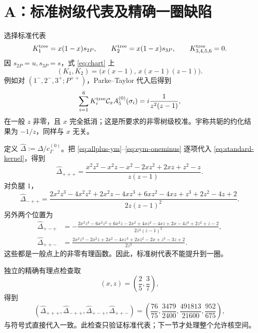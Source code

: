 \documentclass[11pt,a4paper,UTF8]{ctexart}
\newcommand{\cC}{\mathcal C}
\begin{document}
\section{A：标准树级代表及精确一圈缺陷}

选择标准代表
\begin{equation}
K^{\rm tree}_{1}=x(1-x)s_{2P},\qquad
K^{\rm tree}_{2}=x(1-x)s_{3P},\qquad
K^{\rm tree}_{3,4,5,6}=0.
\label{eq:standard-kernel}
\end{equation}
因 $s_{2P}=u,s_{3P}=s$，式 \eqref{eq:chart} 上
\begin{equation}
(K_1,K_2)=\bigl(x(x-1),\,x(x-1)(z-1)\bigr).
\end{equation}
例如对 $(1^-,2^-,3^+;P^{++})$，Parke--Taylor 代入后得到
\begin{equation}
\sum_{i=1}^6K_i^{\rm tree}\cC_xA^{(0)}_5(\sigma_i)
=i\frac{1}{z^2(z-1)},
\label{eq:tree-calibration}
\end{equation}
在一般 $z$ 非零，且 $x$ 完全抵消；这是所要求的非零树级校准。宇称共轭的约化结果为 $-1/z$，同样与 $x$ 无关。

定义 $\widehat\Delta:=\Delta/c_\Gamma^{(0)}$。把
\eqref{eq:allplus-ym}--\eqref{eq:eym-oneminus} 逐项代入 \eqref{eq:standard-kernel}，得到
\begin{equation}
\widehat\Delta_{+++}
=\frac{x^2z^2-x^2z-x^2-2xz^2+2xz+z^2-z}{z(z-1)}.
\label{eq:defect-allplus}
\end{equation}
对负腿 $1$，
\begin{equation}
\widehat\Delta_{-++}
=\frac{
2x^2z^3-4x^2z^2+2x^2z-4xz^3+6xz^2-4xz
+z^3+2z^2-4z+2}
{2z(z-1)^2}.
\label{eq:defect-minus1}
\end{equation}
另外两个位置为
\begin{align}
\widehat\Delta_{+-+}
&=-\frac{
2x^2z^3-6x^2z^2+6x^2z-2x^2+4xz^2-4xz+2x
-4z^3+2z^2+z-2}
{2z^3(z-1)^2},\label{eq:defect-minus2}\\
\widehat\Delta_{++-}
&=\frac{
2x^2z^3-2x^2z+2x^2-4xz^3+2xz^2-2x
+z^3-3z+2}
{2z^3}.
\label{eq:defect-minus3}
\end{align}
这些都是一般点上的非零有理函数。因此，标准树代表不能提升到一圈。

独立的精确有理点检查取
\begin{equation}
(x,z)=\left(\frac25,\frac37\right),
\end{equation}
得到
\begin{equation}
(\widehat\Delta_{+++},\widehat\Delta_{-++},
\widehat\Delta_{+-+},\widehat\Delta_{++-})
=\left(\frac{76}{75},\frac{3479}{2400},
\frac{491813}{21600},\frac{952}{675}\right),
\end{equation}
与符号式直接代入一致。此检查只验证标准代表；下一节才处理整个允许核空间。
\end{document}
